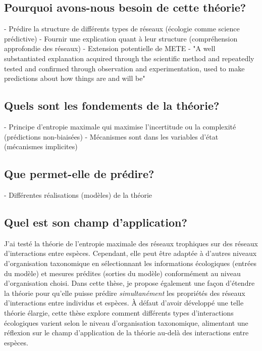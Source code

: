 \subsection{Pourquoi avons-nous besoin de cette théorie?} 

- Prédire la structure de différents types de réseaux (écologie comme science prédictive)
- Fournir une explication quant à leur structure (compréhension approfondie des réseaux)
- Extension potentielle de METE
- "A well substantiated explanation acquired through the scientific method 
and repeatedly tested and confirmed through observation and experimentation, 
used to make predictions about how things are and will be"

\subsection{Quels sont les fondements de la théorie?} 

- Principe d'entropie maximale qui maximise l'incertitude ou la complexité (prédictions non-biaisées) 
- Mécanismes sont dans les variables d'état (mécanismes implicites)

\subsection{Que permet-elle de prédire?} 

- Différentes réalisations (modèles) de la théorie 

\subsection{Quel est son champ d'application?} 

J'ai testé la théorie de l'entropie maximale des réseaux trophiques sur des
réseaux d'interactions entre espèces. Cependant, elle peut être adaptée à
d'autres niveaux d'organisation taxonomique en sélectionnant les informations
écologiques (entrées du modèle) et mesures prédites (sorties du modèle)
conformément au niveau d'organisation choisi. Dans cette thèse, je propose
également une façon d'étendre la théorie pour qu'elle puisse prédire
\textit{simultanément} les propriétés des réseaux d'interactions entre individus
et espèces. À défaut d'avoir développé une telle théorie élargie, cette thèse
explore comment différents types d'interactions écologiques varient selon le
niveau d'organisation taxonomique, alimentant une réflexion sur le champ
d'application de la théorie au-delà des interactions entre espèces. 

